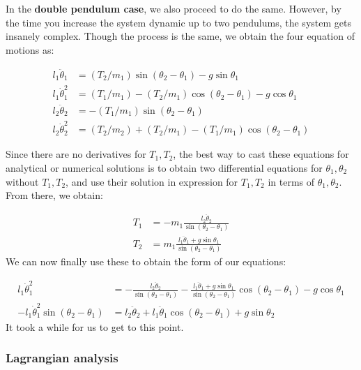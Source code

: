 In the \textbf{double pendulum case}, we also proceed to do the same. However, by the time you increase the system dynamic up to two pendulums, the system gets insanely complex. Though the process is the same, we obtain the four equation of motions as: 


\begin{align}
l_1 \ddot{\theta}_1 & =\left(T_2 / m_1\right) \sin \left(\theta_2-\theta_1\right)-g \sin \theta_1 \\
l_1 \dot{\theta}_1^2 & =\left(T_1 / m_1\right)-\left(T_2 / m_1\right) \cos \left(\theta_2-\theta_1\right)-g \cos \theta_1 \\
l_2 \ddot{\theta}_2 & =-\left(T_1 / m_1\right) \sin \left(\theta_2-\theta_1\right) \\
l_2 \dot{\theta}_2^2 & =\left(T_2 / m_2\right)+\left(T_2 / m_1\right)-\left(T_1 / m_1\right) \cos \left(\theta_2-\theta_1\right)
\end{align}

Since there are no derivatives for $T_{1},T_{2}$, the best way to cast these equations for analytical or numerical solutions is to obtain two differential equations for $\theta_{1},\theta_{2}$ without $T_{1},T_{2}$, and use their solution in expression for $T_{1},T_{2}$ in terms of $\theta_{1},\theta_{2}$. From there, we obtain: 

\begin{align}
  T_{1} & = -m_{1} \frac{l_{2} \ddot{\theta}_{2}}{\sin{(\theta_{2}-\theta_{1})}} \\
  T_{2} &= m_{1} \frac{l_{1}\ddot{\theta}_{1}+ g\sin{\theta_{1}}}{\sin{(\theta_{2}-\theta_{1})}}
\end{align}
We can now finally use these to obtain the form of our equations: 

\begin{align}
  l_{1} \dot{\theta}_{1}^{2} & = -\frac{l_{2} \ddot{\theta}_{2}}{\sin{(\theta_{2}-\theta_{1})}} - \frac{l_{1}\ddot{\theta}_{1}+ g\sin{\theta_{1}}}{\sin{(\theta_{2}-\theta_{1})}}\cos{(\theta_{2}-\theta_{1})} - g\cos{\theta_{1}}\\
  - l_{1} \dot{\theta}_{1}^{2} \sin{(\theta_{2}-\theta_{1})} & = l_{2}\ddot{\theta}_{2} + l_{1} \ddot{\theta}_{1} \cos{(\theta_{2}-\theta_{1})} + g\sin{\theta_{2}}
\end{align}
It took a while for us to get to this point. 

\subsubsection{Lagrangian analysis}

